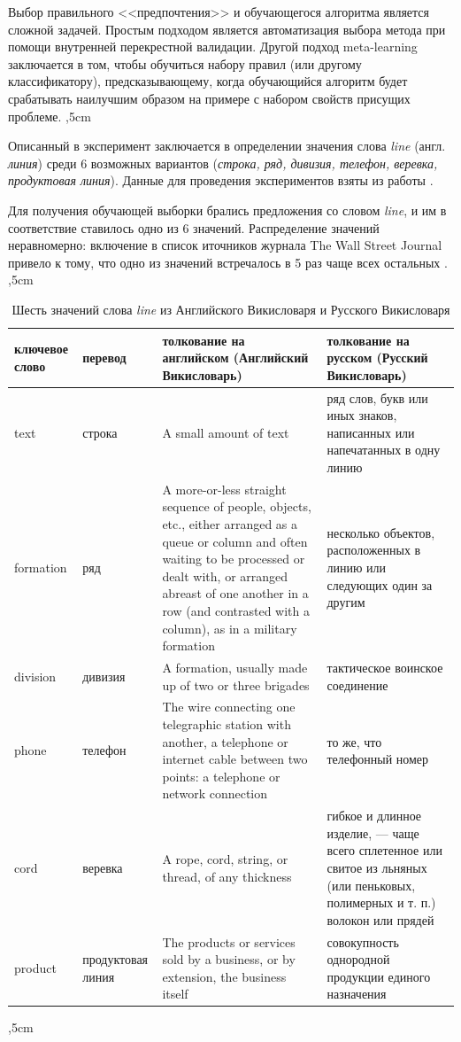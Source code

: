 \documentclass{article}
\begin{document}
\begin{articletext}
Выбор правильного <<предпочтения>> и обучающегося алгоритма является сложной задачей. Простым подходом является автоматизация выбора метода при помощи внутренней перекрестной валидации. Другой подход meta-learning заключается в том, чтобы обучиться набору правил (или другому классификатору), предсказывающему, когда обучающийся алгоритм будет срабатывать наилучшим образом на примере с набором свойств присущих проблеме.
,5cm

Описанный в \cite{Mooney 1996} эксперимент заключается в определении значения слова \textit{line} (англ. \textit{линия}) среди 6 возможных вариантов (\textit{строка, ряд, дивизия, телефон, веревка, продуктовая линия}). Данные для проведения экспериментов взяты из работы \cite{Leacock 1993}.  

Для получения обучающей выборки брались предложения со словом \textit{line}, и им в соответствие ставилось одно из 6 значений. Распределение значений неравномерно: включение в список иточников журнала The Wall Street Journal привело к тому, что одно из значений встречалось в 5 раз чаще всех остальных \cite{Leacock 1993}.
,5cm

\bfullwidth
\begin{table}[H]
\centering
\caption{Шесть значений слова \textit{line} из Английского Викисловаря и Русского Викисловаря}
\begin{tabular}{|m{2cm}|m{2cm}|m{6cm}|m{4cm}|}

\hline
\textbf{ключевое слово} & \textbf{перевод} & \textbf{толкование на английском (Английский Викисловарь)} & \textbf{толкование на русском (Русский Викисловарь)}\\
\hline
text & строка & A small amount of text & ряд слов, букв или иных знаков, написанных или напечатанных в одну линию \\
\hline
formation & ряд & A more-or-less straight sequence of people, objects, etc., either arranged as a queue or column and often waiting to be processed or dealt with, or arranged abreast of one another in a row (and contrasted with a column), as in a military formation & несколько объектов, расположенных в линию или следующих один за другим\\
\hline
division & дивизия & A formation, usually made up of two or three brigades & тактическое воинское соединение \\
\hline
phone & телефон & The wire connecting one telegraphic station with another, a telephone or internet cable between two points: a telephone or network connection & то же, что телефонный номер \\
\hline
cord & веревка & A rope, cord, string, or thread, of any thickness  & гибкое и длинное изделие, — чаще всего сплетенное или свитое из льняных (или пеньковых, полимерных и т. п.) волокон или прядей \\
\hline
product & продуктовая линия & The products or services sold by a business, or by extension, the business itself & совокупность однородной продукции единого назначения  \\
\hline
\end{tabular}
\label{tbl5}
\end{table}
\efullwidth
{},5cm


\end{articletext}
\end{document}
